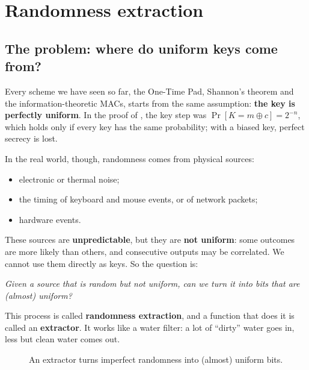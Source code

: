 
\section{Randomness extraction}

\subsection{The problem: where do uniform keys come from?}

Every scheme we have seen so far, the One-Time Pad, Shannon's theorem and the information-theoretic MACs, starts from the same assumption: \textbf{the key is perfectly uniform}. In the proof of , the key step was $\Pr[K = m \oplus c] = 2^{-n}$, which holds only if every key has the same probability; with a biased key, perfect secrecy is lost.

In the real world, though, randomness comes from physical sources:
\begin{itemize}
  \item electronic or thermal noise;
  \item the timing of keyboard and mouse events, or of network packets;
  \item hardware events.
\end{itemize}
These sources are \textbf{unpredictable}, but they are \textbf{not uniform}: some outcomes are more likely than others, and consecutive outputs may be correlated. We cannot use them directly as keys. So the question is:

\begin{center}
  \itshape Given a source that is random but not uniform, can we turn it into bits that are (almost) uniform?
\end{center}

This process is called \textbf{randomness extraction}, and a function that does it is called an \textbf{extractor}. It works like a water filter: a lot of ``dirty'' water goes in, less but clean water comes out.

\begin{figure}[H]
  \centering
  \caption{An extractor turns imperfect randomness into (almost) uniform bits.}
\end{figure}

